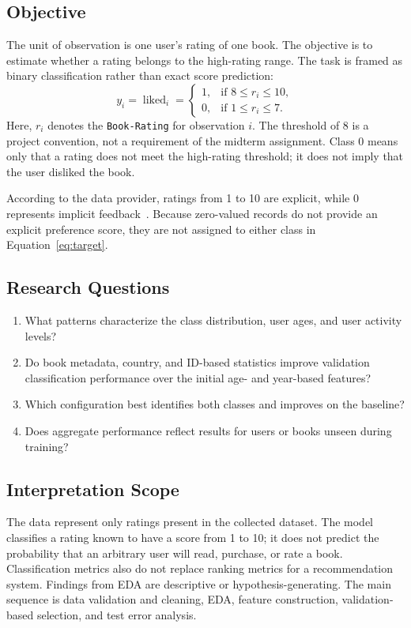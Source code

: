 \documentclass[12pt,a4paper]{article}
\newcommand{\code}[1]{\texttt{#1}}
\begin{document}
\subsection{Objective}
The unit of observation is one user's rating of one book. The objective is to estimate whether a
rating belongs to the high-rating range. The task is framed as binary classification rather than
exact score prediction:
\begin{equation}
 y_i = \operatorname{liked}_i =
 \begin{cases}
  1, & \text{if } 8 \le r_i \le 10,\\
  0, & \text{if } 1 \le r_i \le 7.
 \end{cases}
 \label{eq:target}
\end{equation}
Here, $r_i$ denotes the \code{Book-Rating} for observation $i$. The threshold of 8 is a project
convention, not a requirement of the midterm assignment. Class 0 means only that a rating does not
meet the high-rating threshold; it does not imply that the user disliked the book.

According to the data provider, ratings from 1 to 10 are explicit, while 0 represents implicit
feedback~\cite{dataset,description}. Because zero-valued records do not provide an explicit
preference score, they are not assigned to either class in Equation~\eqref{eq:target}.

\subsection{Research Questions}
\begin{enumerate}
  \item What patterns characterize the class distribution, user ages, and user activity levels?
  \item Do book metadata, country, and ID-based statistics improve validation classification
  performance over the initial age- and year-based features?
  \item Which configuration best identifies both classes and improves on the baseline?
  \item Does aggregate performance reflect results for users or books unseen during training?
\end{enumerate}

\subsection{Interpretation Scope}
The data represent only ratings present in the collected dataset. The model classifies a rating
known to have a score from 1 to 10; it does not predict the probability that an arbitrary user will
read, purchase, or rate a book. Classification metrics also do not replace ranking metrics for a
recommendation system. Findings from EDA are descriptive or hypothesis-generating. The main sequence is data validation
and cleaning, EDA, feature construction, validation-based selection, and test error analysis.
\end{document}
